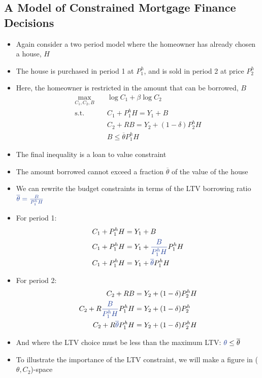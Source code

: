 \documentclass{article}
\numberwithin{equation}{section}
\numberwithin{figure}{section}
\begin{document}
\subsection{A Model of Constrained Mortgage Finance Decisions}
	\begin{itemize}
		\item Again consider a two period model where the homeowner has already chosen a house, \( H \)
		\item The house is purchased in period 1 at \( P_1^h \), and is sold in period 2 at price \( P_2^h \)
		\item Here, the homeowner is restricted in the amount that can be borrowed, \( B \)
		\begin{align*}
			\max_{C_1,C_2,B}\quad &\log C_1 + \beta\log C_2\\
			\text{s.t.}\quad &C_1+P_1^h H = Y_1 + B\\
			&C_2 + RB = Y_2 + (1-\delta) P_2^h H\\
			&B \leq \overline{\theta}P_1^h H
		\end{align*}
		\item The final inequality is a \textcolor{myblue}{loan to value constraint}
		\item The amount borrowed cannot exceed a fraction \( \overline{\theta} \) of the value of the house
		\item We can rewrite the budget constraints in terms of the LTV borrowing ratio \( \textcolor{myblue}{\overline{\theta} =\frac{B}{P_1^h H}} \)
		\item For period 1:
		\begin{align*}
			C_1+P_1^h H &= Y_1 + B\\
			C_1+P_1^h H &= Y_1 + \textcolor{myblue}{\frac{B}{P_1^h H}} P_1^h H\\
			C_1+P_1^h H &= Y_1 + \textcolor{myblue}{\overline{\theta}} P_1^h H
		\end{align*}
		\item For period 2:
		\begin{align*}
			C_2 + RB &= Y_2 + (1-\delta) P_2^h H\\
			C_2 + R\textcolor{myblue}{\frac{B}{P_1^h H}} P_1^h H &= Y_2 + (1-\delta) P_2^h \\
			C_2 + R\textcolor{myblue}{\overline{\theta}} P_1^h H &= Y_2 + (1-\delta) P_2^h H
		\end{align*}
		\item And where the LTV choice must be less than the maximum LTV: \( \textcolor{myblue}{\theta} \leq \overline{\theta} \)
		\item To illustrate the importance of the LTV constraint, we will make a figure in (\( \theta,C_2 \))-space

\end{itemize}
\end{document}
